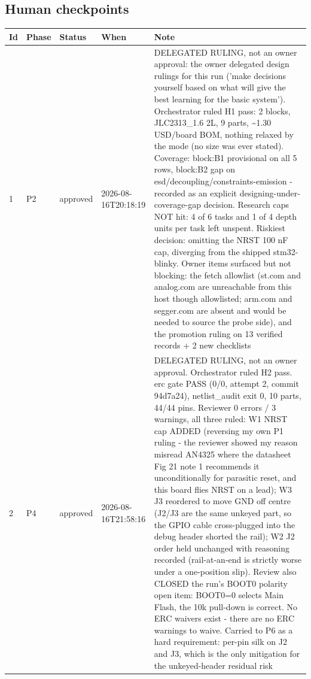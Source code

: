 \documentclass[11pt,a4paper]{article}
\begin{document}
\subsection*{Human checkpoints}
{\small
\begin{longtable}{lllp{2.6cm}p{6.4cm}}
\toprule
\textbf{Id} & \textbf{Phase} & \textbf{Status} & \textbf{When} & \textbf{Note} \\
\midrule
\endhead
1 & P2 & approved & 2026-08-16T20:18:19 & DELEGATED RULING, not an owner approval: the owner delegated design rulings for this run ('make decisions yourself based on what will give the best learning for the basic system'). Orchestrator ruled H1 pass: 2 blocks, JLC2313\_1.6 2L, 9 parts, \textasciitilde{}1.30 USD/board BOM, nothing relaxed by the mode (no size was ever stated). Coverage: block:B1 provisional on all 5 rows, block:B2 gap on esd/decoupling/constraints-emission - recorded as an explicit designing-under-coverage-gap decision. Research caps NOT hit: 4 of 6 tasks and 1 of 4 depth units per task left unspent. Riskiest decision: omitting the NRST 100 nF cap, diverging from the shipped stm32-blinky. Owner items surfaced but not blocking: the fetch allowlist (st.com and analog.com are unreachable from this host though allowlisted; arm.com and segger.com are absent and would be needed to source the probe side), and the promotion ruling on 13 verified records + 2 new checklists \\
2 & P4 & approved & 2026-08-16T21:58:16 & DELEGATED RULING, not an owner approval. Orchestrator ruled H2 pass. erc gate PASS (0/0, attempt 2, commit 94d7a24), netlist\_audit exit 0, 10 parts, 44/44 pins. Reviewer 0 errors / 3 warnings, all three ruled: W1 NRST cap ADDED (reversing my own P1 ruling - the reviewer showed my reason misread AN4325 where the datasheet Fig 21 note 1 recommends it unconditionally for parasitic reset, and this board flies NRST on a lead); W3 J3 reordered to move GND off centre (J2/J3 are the same unkeyed part, so the GPIO cable cross-plugged into the debug header shorted the rail); W2 J2 order held unchanged with reasoning recorded (rail-at-an-end is strictly worse under a one-position slip). Review also CLOSED the run's BOOT0 polarity open item: BOOT0=0 selects Main Flash, the 10k pull-down is correct. No ERC waivers exist - there are no ERC warnings to waive. Carried to P6 as a hard requirement: per-pin silk on J2 and J3, which is the only mitigation for the unkeyed-header residual risk \\

\end{longtable}}
\end{document}
